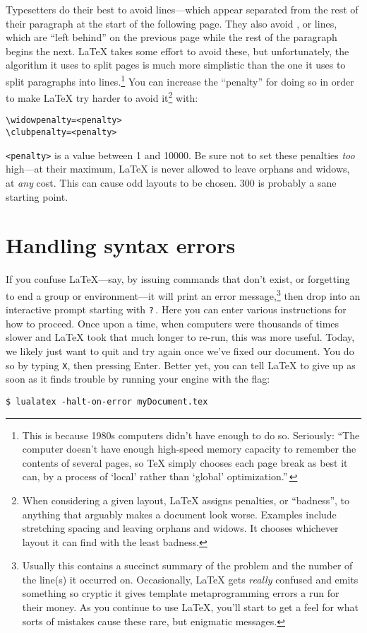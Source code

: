 Typesetters do their best to avoid  lines---which appear
separated from the rest of their paragraph at the start of the following
page.
They also avoid , or  lines,
which are ``left behind'' on the previous page while the rest of the paragraph
begins the next.
\LaTeX{} takes some effort to avoid these, but unfortunately, the algorithm it
uses to split pages is much more simplistic than the one it uses
to split paragraphs into lines.\punckern\footnote{This is because
1980s computers didn't have enough  to do so. Seriously:
``The computer doesn't have enough high-speed memory capacity to remember the
contents of several pages,
so \TeX{} simply chooses each page break as best it can, by a process of
`local' rather than `global' optimization.\quotekern''\,}
You can increase the ``penalty'' for doing so in order to make \LaTeX{}
try harder to avoid it\footnote{When considering a given layout,
\LaTeX{} assigns penalties, or ``badness''\quotekern,
to anything that arguably makes a document look worse.
Examples include stretching spacing and leaving orphans and widows.
It chooses whichever layout it can find with the least badness.}
with:
\begin{leftfigure}
\begin{lstlisting}
\widowpenalty=<penalty>
\clubpenalty=<penalty>
\end{lstlisting}
\end{leftfigure}
\verb|<penalty>| is a value between 1 and 10000.
Be sure not to set these penalties \emph{too} high---at their maximum,
\LaTeX{} is never allowed to leave orphans and widows, at \emph{any} cost.
This can cause odd layouts to be chosen.
300 is probably a sane starting point.

\section{Handling syntax errors}
If you confuse \LaTeX{}---say, by issuing commands that don't exist,
or forgetting to end a group or environment---it will print an
error message,\punckern\footnote{Usually this contains a succinct summary of
the problem and the number of the line(s) it occurred on. Occasionally,
\LaTeX{} gets \emph{really} confused and emits something so cryptic it gives
\cpp{} template metaprogramming errors a run for their money.
As you continue to use \LaTeX, you'll start to get a feel for what sorts of
mistakes cause these rare, but enigmatic messages.}
then drop into an interactive prompt starting with \texttt{?}\,.
Here you can enter various instructions for how to proceed.
Once upon a time, when computers were thousands of times slower and
\LaTeX{} took that much longer to re-run, this was more useful.
Today, we likely just want to quit and try again once we've fixed our document.
You do so by typing \texttt{X}, then pressing Enter.
Better yet, you can tell \LaTeX{} to give up as soon as it finds trouble
by running your engine with the  flag:
\begin{leftfigure}
\begin{lstlisting}
$ lualatex -halt-on-error myDocument.tex
\end{lstlisting}
\end{leftfigure}
